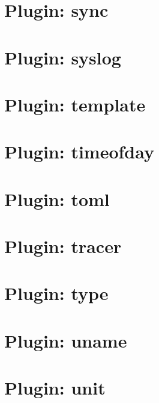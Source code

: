 \let\mypdfximage\pdfximage\def\pdfximage{\immediate\mypdfximage}\documentclass[twoside]{book}
\newcommand{\+}{\discretionary{\mbox{\scriptsize$\hookleftarrow$}}{}{}}
\begin{document}
\chapter{Plugin\+: sync}
\label{md_src_plugins_sync_README}

\chapter{Plugin\+: syslog}
\label{md_src_plugins_syslog_README}

\chapter{Plugin\+: template}
\label{md_src_plugins_template_README}

\chapter{Plugin\+: timeofday}
\label{md_src_plugins_timeofday_README}

\chapter{Plugin\+: toml}
\label{md_src_plugins_toml_README}

\chapter{Plugin\+: tracer}
\label{md_src_plugins_tracer_README}

\chapter{Plugin\+: type}
\label{md_src_plugins_type_README}

\chapter{Plugin\+: uname}
\label{md_src_plugins_uname_README}

\chapter{Plugin\+: unit}
\label{md_src_plugins_unit_README}

\end{document}
